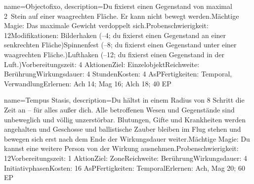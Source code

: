 {
    name={Objectofixo},
    description={Du fixierst einen Gegenstand von maximal 2 Stein auf einer waagrechten Fläche. Er kann nicht bewegt werden.\newline Mächtige Magie: Das maximale Gewicht verdoppelt sich.\newline Probenschwierigkeit: 12\newline Modifikationen: Bilderhaken (–4; du fixierst einen Gegenstand an einer senkrechten Fläche)\newline Spinnenfest (–8; du fixierst einen Gegenstand unter einer waagrechten Fläche.)\newline Lufthaken (–12; du fixierst einen Gegenstand in der Luft.)\newline Vorbereitungszeit: 4 Aktionen\newline Ziel: Einzelobjekt\newline Reichweite: Berührung\newline Wirkungsdauer: 4 Stunden\newline Kosten: 4 AsP\newline Fertigkeiten: Temporal, Verwandlung\newline Erlernen: Ach 14; Mag 16; Alch 18; 40 EP}
}


{
    name={Tempus Stasis},
    description={Du hältst in einem Radius von 8 Schritt die Zeit an – für alles außer dich. Alle betroffenen Wesen und Gegenstände sind unbeweglich und völlig unzerstörbar. Blutungen, Gifte und Krankheiten werden angehalten und Geschosse und ballistische Zauber bleiben im Flug stehen und bewegen sich erst nach dem Ende der Wirkungsdauer weiter.\newline Mächtige Magie: Du kannst eine weitere Person von der Wirkung ausnehmen.\newline Probenschwierigkeit: 12\newline Vorbereitungszeit: 1 Aktion\newline Ziel: Zone\newline Reichweite: Berührung\newline Wirkungsdauer: 4 Initiativphasen\newline Kosten: 16 AsP\newline Fertigkeiten: Temporal\newline Erlernen: Ach, Mag 20; 60 EP}
}


